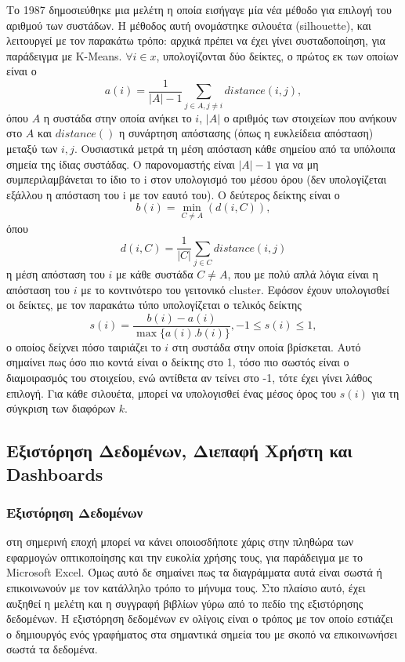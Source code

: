 \documentclass[greek, 12pt]{article}
\begin{document}
Το 1987 δημοσιεύθηκε μια μελέτη η οποία εισήγαγε μία νέα μέθοδο για επιλογή του αριθμού των συστάδων. \cite{rousseeuw1987silhouettes} Η μέθοδος αυτή ονομάστηκε σιλουέτα (silhouette), και λειτουργεί με τον παρακάτω τρόπο: αρχικά πρέπει να έχει γίνει συσταδοποίηση, για παράδειγμα με K-Means. $\forall i \in x$, υπολογίζονται δύο δείκτες, ο πρώτος εκ των οποίων είναι ο \[ a(i)=\frac{1}{|A|-1}  \sum_{j \in A,j \neq i}distance(i,j),\] όπου $A$ η συστάδα στην οποία ανήκει το $i$, $|Α|$ ο αριθμός των στοιχείων που ανήκουν στο $A$ και $distance()$ η συνάρτηση απόστασης (όπως η ευκλείδεια απόσταση) μεταξύ των $i,j$. Ουσιαστικά μετρά τη μέση απόσταση κάθε σημείου από τα υπόλοιπα σημεία της ίδιας συστάδας. Ο παρονομαστής είναι $|A|-1$ για να μη συμπεριλαμβάνεται το ίδιο το i στον υπολογισμό του μέσου όρου (δεν υπολογίζεται εξάλλου η απόσταση του i με τον εαυτό του). Ο δεύτερος δείκτης είναι ο \[ b(i)=\min_{C \neq A}(d(i,C)),\] όπου \[ d(i,C)=\frac{1}{|C|} \sum_{j \in C} distance(i,j)\] η μέση απόσταση του $i$ με κάθε συστάδα $C \neq A$, που με πολύ απλά λόγια είναι η απόσταση του $i$ με το κοντινότερο του γειτονικό cluster.
Εφόσον έχουν υπολογισθεί οι δείκτες, με τον παρακάτω τύπο υπολογίζεται ο τελικός δείκτης \[ s(i)=\frac{b(i)-a(i)}{\max{\{a(i).b(i)\}}},-1 \leq s(i) \leq 1,\] ο οποίος δείχνει πόσο ταιριάζει το $i$ στη συστάδα στην οποία βρίσκεται. Αυτό σημαίνει πως όσο πιο κοντά είναι ο δείκτης στο 1, τόσο πιο σωστός είναι ο διαμοιρασμός του στοιχείου, ενώ αντίθετα αν τείνει στο -1, τότε έχει γίνει λάθος επιλογή. Για κάθε σιλουέτα, μπορεί να υπολογισθεί ένας μέσος όρος του $s(i)$ για τη σύγκριση των διαφόρων $k$.

\subsection{Εξιστόρηση Δεδομένων, Διεπαφή Χρήστη και Dashboards}

\subsubsection{Εξιστόρηση Δεδομένων}

 στη σημερινή εποχή μπορεί να κάνει οποιοσδήποτε χάρις στην πληθώρα των εφαρμογών οπτικοποίησης και την ευκολία χρήσης τους, για παράδειγμα με το Microsoft Excel. Όμως αυτό δε σημαίνει πως τα διαγράμματα αυτά είναι σωστά ή επικοινωνούν με τον κατάλληλο τρόπο το μήνυμα τους. Στο πλαίσιο αυτό, έχει αυξηθεί η μελέτη και η συγγραφή βιβλίων γύρω από το πεδίο της εξιστόρησης δεδομένων. Η εξιστόρηση δεδομένων εν ολίγοις είναι ο τρόπος με τον οποίο εστιάζει ο δημιουργός ενός γραφήματος στα σημαντικά σημεία του με σκοπό να επικοινωνήσει σωστά τα δεδομένα. \cite{echeverria2018driving}
\end{document}
